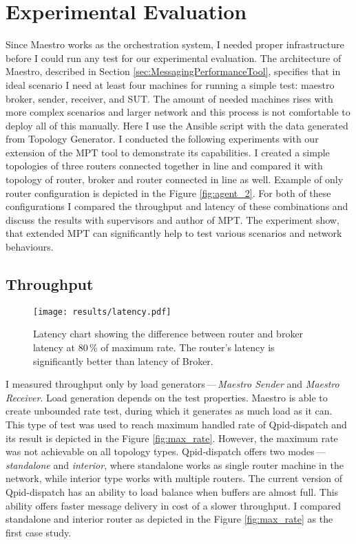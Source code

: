\documentclass{ExcelAtFIT}
\begin{document}
\section{Experimental Evaluation}
\label{sec:experimental_evaluation}

Since Maestro works as the orchestration system, I needed proper infrastructure before I could run any test for our experimental evaluation. The architecture of Maestro, described in Section \ref{sec:MessagingPerformanceTool}, specifies that in ideal scenario I need at least four machines for running a simple test: maestro broker, sender, receiver, and SUT. The amount of needed machines rises with more complex scenarios and larger network and this process is not comfortable to deploy all of this manually. Here I use the Ansible script with the data generated from Topology Generator. I conducted the following experiments with our extension of the MPT tool to demonstrate its capabilities. I created a simple topologies of three routers connected together in line and compared it with topology of router, broker and router connected in line as well. Example of only router configuration is depicted in the Figure \ref{fig:agent_2}. For both of these configurations I compared the throughput and latency of these combinations and discuss the results with supervisors and author of MPT. The experiment show, that extended MPT can significantly help to test various scenarios and network behaviours.

\subsection{Throughput}
\label{Throughput}

\begin{figure*}[h!t]
	\centering
	\texttt{[image: results/latency.pdf]}
	\caption{Latency chart showing the difference between router and broker latency at 80\,\% of maximum rate. The router's latency is significantly better than latency of Broker.}
	\label{fig:latency}
\end{figure*}

I measured throughput only by load generators\,---\,\emph{Maes\-tro Sender} and \emph{Maestro Receiver}. Load generation depends on the test properties. Maestro is able to create unbounded rate test, during which it generates as much load as it can. This type of test was used to reach maximum handled rate of Qpid-dispatch and its result is depicted in the Figure \ref{fig:max_rate}. However, the maximum rate was not achievable on all topology types. Qpid-dispatch offers two modes\,---\,\emph{standalone} and \emph{interior}, where standalone works as single router machine in the network, while interior type works with multiple routers. The current version of Qpid-dispatch has an ability to load balance when buffers are almost full. This ability offers faster message delivery in cost of a slower throughput. I compared standalone and interior router as depicted in the Figure \ref{fig:max_rate} as the first case study.
\end{document}
